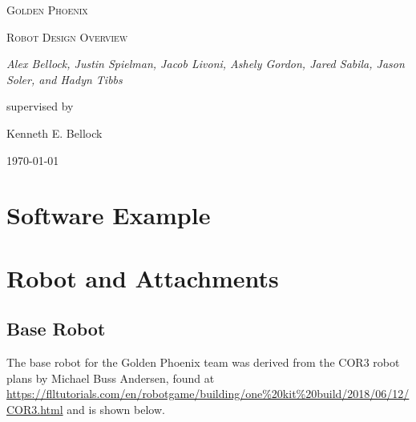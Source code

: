 \documentclass[letter, article]{article}
\begin{document}
\begin{titlepage}
	\centering
	{\scshape\LARGE Golden Phoenix \par}
	\vspace{1cm}
	{\scshape\Large Robot Design Overview\par}
	\vspace{1.5cm}
	{\huge\bfseries \par}
	\vspace{2cm}
	{\Large\itshape Alex Bellock, Justin Spielman, Jacob Livoni, Ashely Gordon, Jared Sabila, Jason Soler, and Hadyn Tibbs\par}
	\vfill
	supervised by\par
	Kenneth E. Bellock

	\vfill

	{\large \today\par}
\end{titlepage}

\section{Software Example}

\begin{center}
\end{center}

\begin{center}
\end{center}

\section{Robot and Attachments}

\subsection{Base Robot}

The base robot for the Golden Phoenix team was derived from the COR3 robot plans by Michael Buss Andersen, found at \url{https://flltutorials.com/en/robotgame/building/one%20kit%20build/2018/06/12/COR3.html} and is shown below.
\end{document}
